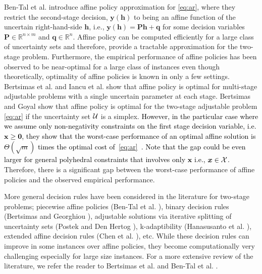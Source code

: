 \documentclass[moor]{informs1}              %
\newcommand{\mb}[1]{\ensuremath{\boldsymbol{#1}}}
\newcommand*{\red}{\textcolor{black}}
\begin{document}
Ben-Tal et al. \cite{Ben-Tal04} introduce affine policy approximation for \eqref{eq:ar}, where they restrict the second-stage decision, $\mb{y}(\mb{h})$ to being an affine function of the uncertain right-hand-side $\mb{h}$, i.e.,  $\mb{y}(\mb{h})=\mb{P}\mb{h}+\mb{q}$ for some decision variables $\mb{P}\in{\mathbb R}^{n\times m}$ and $\mb{q}\in{\mathbb R}^n$. Affine policy can be computed efficiently for a large class of uncertainty sets and therefore, provide a tractable approximation for the two-stage problem. Furthermore, the empirical performance of affine policies has been observed to be near-optimal for a large class of instances even though theoretically, optimality of affine policies is known in only a few settings. Bertsimas et al. \cite{BIP09} and Iancu et al. \cite{ISS13} show that affine policy is optimal for multi-stage adjustable problems with a single uncertain parameter at each stage. Bertsimas and Goyal \cite{BG10} show that affine policy is optimal for the two-stage adjustable problem \eqref{eq:ar} if the uncertainty set ${\cal U}$ is a simplex. \red{However, in the particular case where we assume only non-negativity constraints on the first stage decision variable, i.e. $\mb x \geq \mb 0$, they show that
the worst-case performance of an optimal affine solution is $\Theta(\sqrt m)$ times the optimal cost of~\eqref{eq:ar}~\cite{BG10}. Note that the gap could be even larger for general polyhedral constraints that involves only $\mb x$ i.e., $\mb x \in {\cal X}$.} Therefore, there is a significant gap between the worst-case performance of affine policies and the observed empirical performance. 


More general decision rules have been considered in the literature for two-stage problems; piecewise affine policies (Ben-Tal et al. \cite{ben2018tractable}), binary decision rules (Bertsimas and Georghiou \cite{bertsimas2015design}), adjustable solutions via iterative splitting of uncertainty sets (Postek and Den Hertog \cite{postek2016multistage}), k-adaptibility (Hanasusanto et al. \cite{hanasusanto2015k}), extended affine decision rules (Chen et al. \cite{chen2008linear}), etc. While these decision rules can improve in some instances over affine policies, they become computationally very challenging especially for large size instances. %
For a more extensive review of the  literature, we refer the reader to Bertsimas et al. \cite{BBC08} and Ben-Tal et al. \cite{BNE10}.
\end{document}
